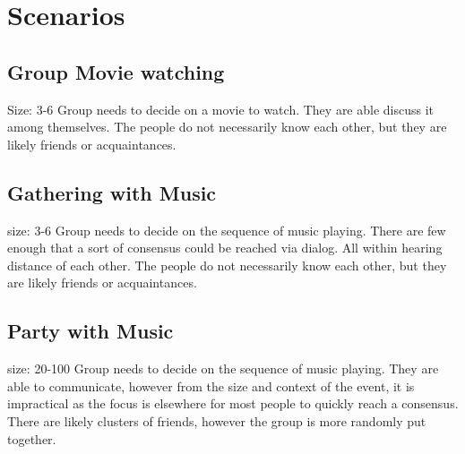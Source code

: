 \section{Scenarios}

\subsection{Group Movie watching}
Size: 3-6
Group needs to decide on a movie to watch. They are able discuss it among themselves. The people do not necessarily know each other, but they are likely friends or acquaintances.
\subsection{Gathering with Music}
size: 3-6
Group needs to decide on the sequence of music playing. There are few enough that a sort of consensus could be reached via dialog. All within hearing distance of each other. The people do not necessarily know each other, but they are likely friends or acquaintances.
\subsection{Party with Music}
size: 20-100
Group needs to decide on the sequence of music playing. They are able to communicate, however from the size and context of the event, it is impractical as the focus is elsewhere for most people to quickly reach a consensus. There are likely clusters of friends, however the group is more randomly put together.